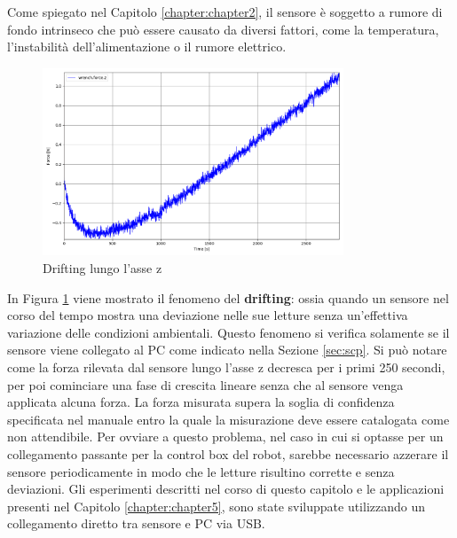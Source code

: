 Come spiegato nel Capitolo \ref{chapter:chapter2}, il sensore \`{e} soggetto a rumore di fondo intrinseco che 
pu\`{o} essere causato da diversi fattori, come la temperatura, l'instabilit\`{a} dell'alimentazione o il rumore elettrico. 
\newpage
\begin{figure}[H]
    \centering
    \includegraphics*[width=0.80\textwidth]{images/drifting.png}
    \caption{Drifting lungo l'asse z}
    \label{fig:drifting}
\end{figure}
In Figura \ref{fig:drifting} viene mostrato il fenomeno del \textbf{drifting}: ossia quando un sensore nel corso del tempo 
mostra una deviazione nelle sue letture senza un'effettiva variazione delle condizioni ambientali. Questo fenomeno si verifica 
solamente se il sensore viene collegato al PC come indicato nella Sezione \ref{sec:scp}. 
Si pu\`{o} notare come la forza rilevata dal sensore lungo l'asse z decresca per i primi 250 secondi, per poi 
cominciare una fase di crescita lineare senza che al sensore venga applicata alcuna forza. 
La forza misurata supera la soglia di confidenza specificata nel manuale entro la 
quale la misurazione deve essere catalogata come non attendibile. 
Per ovviare a questo problema, nel caso in cui si optasse per un collegamento passante per la control box del robot, 
sarebbe necessario azzerare il sensore periodicamente in modo che le letture risultino corrette e senza deviazioni. 
Gli esperimenti descritti nel corso di questo capitolo e le applicazioni presenti nel Capitolo \ref{chapter:chapter5}, sono state 
sviluppate utilizzando un collegamento diretto tra sensore e PC via USB.
